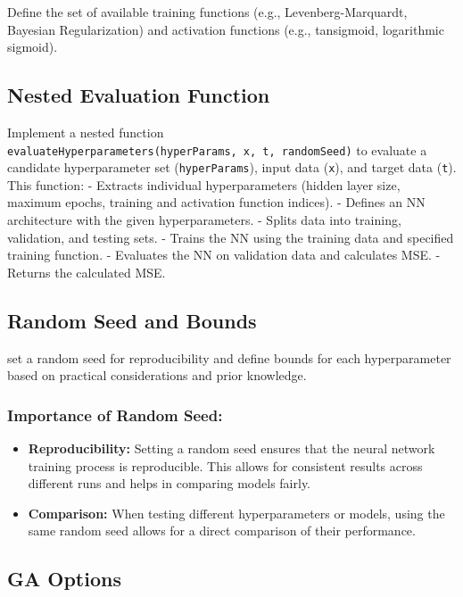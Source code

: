 \documentclass[
  super,
  review,
  3p]{elsarticle}
\providecommand{\tightlist}{%
  \setlength{\itemsep}{0pt}\setlength{\parskip}{0pt}}\usepackage{longtable,booktabs,array}
\begin{document}
Define the set of available training functions (e.g.,
Levenberg-Marquardt, Bayesian Regularization) and activation functions
(e.g., tansigmoid, logarithmic sigmoid).

\subsection{Nested Evaluation
Function}\label{nested-evaluation-function}

Implement a nested function
\texttt{evaluateHyperparameters(hyperParams,\ x,\ t,\ randomSeed)} to
evaluate a candidate hyperparameter set (\texttt{hyperParams}), input
data (\texttt{x}), and target data (\texttt{t}). This function: -
Extracts individual hyperparameters (hidden layer size, maximum epochs,
training and activation function indices). - Defines an NN architecture
with the given hyperparameters. - Splits data into training, validation,
and testing sets. - Trains the NN using the training data and specified
training function. - Evaluates the NN on validation data and calculates
MSE. - Returns the calculated MSE.

\subsection{Random Seed and Bounds}\label{random-seed-and-bounds}

set a random seed for reproducibility and define bounds for each
hyperparameter based on practical considerations and prior knowledge.

\subsubsection{Importance of Random
Seed:}\label{importance-of-random-seed}

\begin{itemize}
\tightlist
\item
  \textbf{Reproducibility:} Setting a random seed ensures that the
  neural network training process is reproducible. This allows for
  consistent results across different runs and helps in comparing models
  fairly.
\item
  \textbf{Comparison:} When testing different hyperparameters or models,
  using the same random seed allows for a direct comparison of their
  performance.
\end{itemize}

\subsection{GA Options}\label{ga-options}
\end{document}

